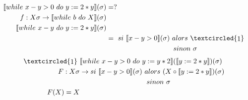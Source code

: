 \documentclass[11pt,a4paper]{article}
\newcommand{\circled}[1]{\textcircled{\raisebox{-0.9pt}{#1}}}
\newcommand{\llbr}{\llbracket}
\newcommand{\rrbr}{\rrbracket}
\begin{document}
	\begin{align*}
		\llbr while\ x - y > 0\ do\ y := 2 * y \rrbr (\sigma) &= ?\\
		f : X \sigma \to \llbr while\ b\ do\ X \rrbr (\sigma)&\\
		\llbr while\ x - y\ do\ y := 2 * y \rrbr(\sigma)&\\
		&=\ si\ \llbr x - y > 0 \rrbr(\sigma)\ alors\ \circled{1}\\
		&\ \ \ \ \ \ \ \ \ \ \ \ \ \ \ \ \ \ \ \ \ \ \ \ \ \ \ \ \ sinon\ \sigma\\
	\end{align*}
	\begin{align*}
		\circled{1}\ &\llbr while\ x - y > 0\ do\ y := y * 2 \rrbr (\llbr y := 2 * y \rrbr) (\sigma)\\
		F : X \sigma &\to si\ \llbr x - y > 0 \rrbr (\sigma)\ alors\ (X \circ \llbr y := 2 * y \rrbr)(\sigma)\\
		&\ \ \ \ \ \ \ \ \ \ \ \ \ \ \ \ \ \ \ \ \ \ \ \ \ \ \ \ \ sinon\ \sigma\\
		F(X) = X&\\
	\end{align*}
\end{document}

